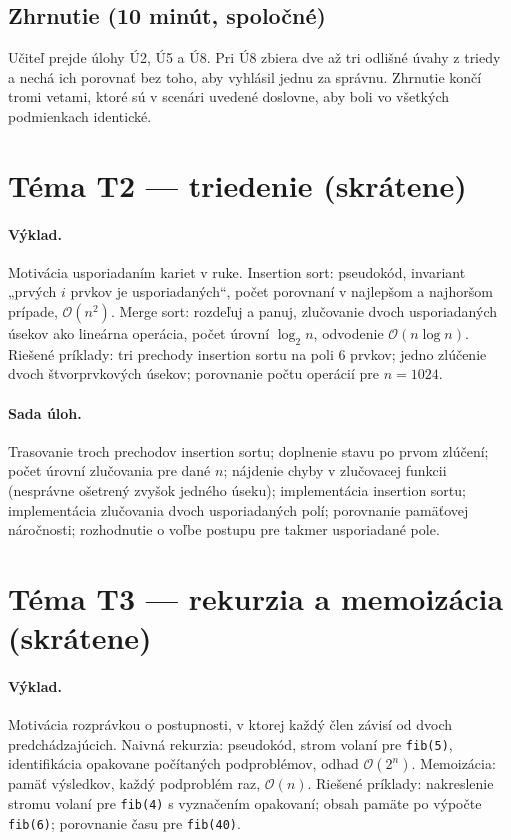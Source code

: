 \subsection{Zhrnutie (10 minút, spoločné)}

Učiteľ prejde úlohy Ú2, Ú5 a Ú8. Pri Ú8 zbiera dve až tri odlišné úvahy z triedy a nechá ich porovnať bez toho, aby vyhlásil jednu za správnu. Zhrnutie končí tromi vetami, ktoré sú v scenári uvedené doslovne, aby boli vo všetkých podmienkach identické.

\section{Téma T2 --- triedenie (skrátene)}

\paragraph{Výklad.} Motivácia usporiadaním kariet v ruke. Insertion sort: pseudokód, invariant „prvých $i$ prvkov je usporiadaných“, počet porovnaní v najlepšom a najhoršom prípade, $\mathcal{O}(n^2)$. Merge sort: rozdeľuj a panuj, zlučovanie dvoch usporiadaných úsekov ako lineárna operácia, počet úrovní $\log_2 n$, odvodenie $\mathcal{O}(n\log n)$. Riešené príklady: tri prechody insertion sortu na poli 6 prvkov; jedno zlúčenie dvoch štvorprvkových úsekov; porovnanie počtu operácií pre $n=1024$.

\paragraph{Sada úloh.} Trasovanie troch prechodov insertion sortu; doplnenie stavu po prvom zlúčení; počet úrovní zlučovania pre dané $n$; nájdenie chyby v zlučovacej funkcii (nesprávne ošetrený zvyšok jedného úseku); implementácia insertion sortu; implementácia zlučovania dvoch usporiadaných polí; porovnanie pamäťovej náročnosti; rozhodnutie o voľbe postupu pre takmer usporiadané pole.

\section{Téma T3 --- rekurzia a memoizácia (skrátene)}

\paragraph{Výklad.} Motivácia rozprávkou o postupnosti, v ktorej každý člen závisí od dvoch predchádzajúcich. Naivná rekurzia: pseudokód, strom volaní pre \texttt{fib(5)}, identifikácia opakovane počítaných podproblémov, odhad $\mathcal{O}(2^n)$. Memoizácia: pamäť výsledkov, každý podproblém raz, $\mathcal{O}(n)$. Riešené príklady: nakreslenie stromu volaní pre \texttt{fib(4)} s vyznačením opakovaní; obsah pamäte po výpočte \texttt{fib(6)}; porovnanie času pre \texttt{fib(40)}.

